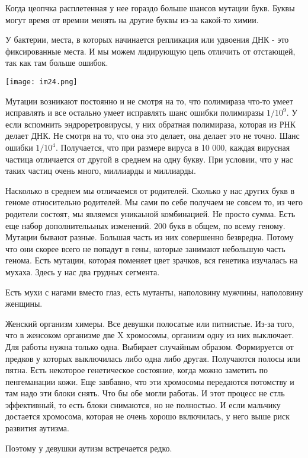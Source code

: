 Когда цеопчка расплетенная у нее гораздо больше шансов мутации букв. Буквы могут время от времни 
менять на другие буквы из-за какой-то химии. 

У бактерии, места, в которых начинается репликация или удвоения ДНК - это 
фиксированные места. И мы можем лидирующую цепь отличить от отстающей, 
так как там больше ошибок. 

\texttt{[image: im24.png]}

Мутации возникают постоянно и не смотря на то, что 
полимираза что-то умеет исправлять и все остально умеет исправлять
шанс ошибки полимиразы $1/10^9$. У если вспомнить 
эндроретровирусы, у них обратная полимираза, 
которая из РНК делает ДНК. Не смотря на то, что она 
это делает, она делает это не точно. Шанс ошибки $1/10^4$. 
Получается, что при размере вируса в 10 000, каждая вирусная 
частица отличается от другой в среднем на одну букву. При 
условии, что у нас таких частиц очень много, миллиарды и миллиарды. 

Насколько в среднем мы отличаемся от родителей. Сколько у
нас других букв в геноме относительно родителей. Мы сами по себе 
получаем не совсем то, из чего родители состоят, мы являемся уникаьной комбинацией. 
Не просто сумма. Есть еще набор дополнителььных изменений. 200 букв в общем, 
по всему геному. Мутации бывают разные. 
Большая часть из них совершенно безвредна. Потому что они скорее всего 
не попадут в гены, которые занимают небольшую часть генома. Есть мутации, 
которая поменяет цвет зрачков, вся генетика изучалась на мухаха. Здесь 
у нас два грудных сегмента. 

Есть мухи с нагами вместо глаз, 
есть мутанты, наполовину мужчины, наполовину женщины. 

Женский организм химеры. Все девушки полосатые или питнистые. Из-за того, 
что в женсоком организме две X хромосомы, организм одну из них выключает. Для 
работы нужна только одна. Выбирает случайным образом. Формируется от предков у которых 
выключилась либо одна либо другая. Получаются полосы или пятна. 
Есть некоторое генетическое состояние, когда можно заметить по пенгеманации кожи. 
Еще завбавно, что эти хромосомы передаются потомству и там 
надо эти блоки снять. Что бы обе могли работаь. И этот 
процесс не стль эффективный, то есть блоки снимаются, но не полностью. 
И если мальчику достается хромосома, которая не очень хорошо включилась, 
у него выше риск развития аутизма. 

Поэтому у девушки аутизм встречается редко. 

